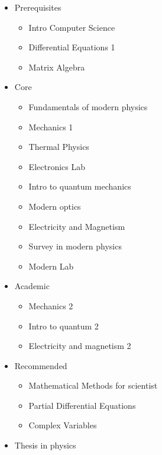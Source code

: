 \begin{itemize}
    \item Prerequisites
    \begin{itemize}
        \item Intro Computer Science
        \item Differential Equations 1
        \item Matrix Algebra
    \end{itemize}
    \item Core
    \begin{itemize}
        \item Fundamentals of modern physics
        \item Mechanics 1
        \item Thermal Physics
        \item Electronics Lab
        \item Intro to quantum mechanics
        \item Modern optics
        \item Electricity and Magnetism
        \item Survey in modern physics
        \item Modern Lab
        
    \end{itemize}
    \item Academic
    \begin{itemize}
        \item Mechanics 2
        \item Intro to quantum 2
        \item Electricity and magnetism 2
        
    \end{itemize}
    \item Recommended
    \begin{itemize}
        \item Mathematical Methods for scientist
        \item Partial Differential Equations
        \item Complex Variables
    \end{itemize}
    \item Thesis in physics
\end{itemize}
